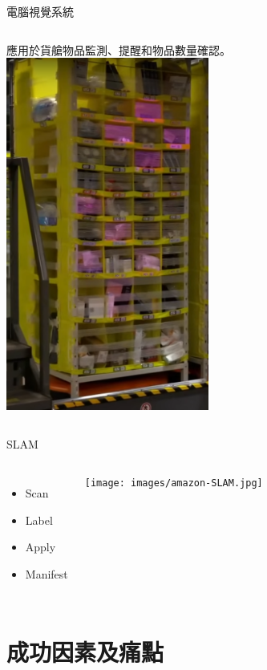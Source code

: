 \documentclass[10pt, aspectratio=169]{beamer}
\begin{document}
{
\begin{frame}{電腦視覺系統}
  \begin{columns}
      應用於貨艙物品監測、提醒和物品數量確認。
      \centering
      \includegraphics[width=0.5\textwidth]{images/amazon-pod-lights.png}
  \end{columns}
	
\end{frame}
}

{
\begin{frame}{SLAM}
  \begin{columns}
  \begin{itemize}
    \item Scan
    \item Label
    \item Apply
    \item Manifest
  \end{itemize}
      \centering
      \texttt{[image: images/amazon-SLAM.jpg]}
\end{columns}
\end{frame}
}

\section{成功因素及痛點}
\end{document}
